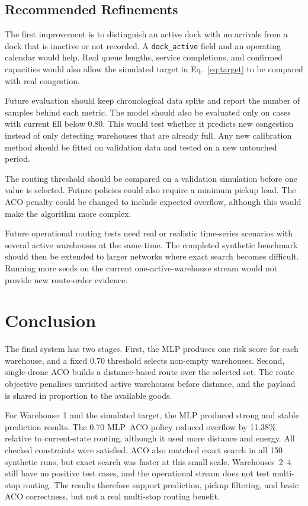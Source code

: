 \documentclass[10pt]{article}
\begin{document}
\subsection{Recommended Refinements}

The first improvement is to distinguish an active dock with no arrivals from a dock that is inactive or not recorded. A \texttt{dock\_active} field and an operating calendar would help. Real queue lengths, service completions, and confirmed capacities would also allow the simulated target in Eq.~\eqref{eq:target} to be compared with real congestion.

Future evaluation should keep chronological data splits and report the number of samples behind each metric. The model should also be evaluated only on cases with current fill below 0.80. This would test whether it predicts new congestion instead of only detecting warehouses that are already full. Any new calibration method should be fitted on validation data and tested on a new untouched period.

The routing threshold should be compared on a validation simulation before one value is selected. Future policies could also require a minimum pickup load. The ACO penalty could be changed to include expected overflow, although this would make the algorithm more complex.

Future operational routing tests need real or realistic time-series scenarios with several active warehouses at the same time. The completed synthetic benchmark should then be extended to larger networks where exact search becomes difficult. Running more seeds on the current one-active-warehouse stream would not provide new route-order evidence.

\section{Conclusion}

The final system has two stages. First, the MLP produces one risk score for each warehouse, and a fixed 0.70 threshold selects non-empty warehouses. Second, single-drone ACO builds a distance-based route over the selected set. The route objective penalises unvisited active warehouses before distance, and the payload is shared in proportion to the available goods.

For Warehouse~1 and the simulated target, the MLP produced strong and stable prediction results. The 0.70 MLP--ACO policy reduced overflow by 11.38\% relative to current-state routing, although it used more distance and energy. All checked constraints were satisfied. ACO also matched exact search in all 150 synthetic runs, but exact search was faster at this small scale. Warehouses~2--4 still have no positive test cases, and the operational stream does not test multi-stop routing. The results therefore support prediction, pickup filtering, and basic ACO correctness, but not a real multi-stop routing benefit.
\end{document}
